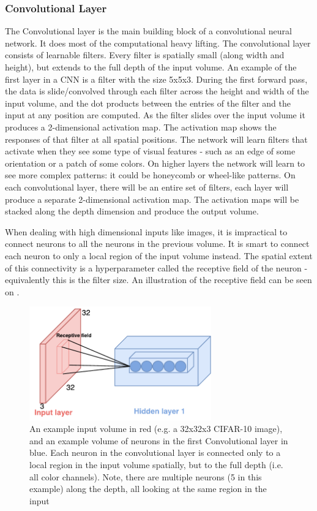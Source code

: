 \subsubsection{Convolutional Layer}
The Convolutional layer is the main building block of a convolutional neural network. It does most of the computational heavy lifting. The convolutional layer consists of learnable filters. Every filter is spatially small (along width and height), but extends to the full depth of the input volume. An example of the first layer in a CNN is a filter with the size 5x5x3. During the first forward pass, the data is slide/convolved through each filter across the height and width of the input volume, and the dot products between the entries of the filter and the input at any position are computed. As the filter slides over the input volume it produces a 2-dimensional activation map. The activation map shows the responses of that filter at all spatial positions. The network will learn filters that activate when they see some type of visual features - such as an edge of some orientation or a patch of some colors. On higher layers the network will learn to see more complex patterns: it could be honeycomb or wheel-like patterns. On each convolutional layer, there will be an entire set of filters, each layer will produce a separate 2-dimensional activation map. The activation maps will be stacked along the depth dimension and produce the output volume. 

When dealing with high dimensional inputs like images, it is impractical to connect neurons to all the neurons in the previous volume. It is smart to connect each neuron to only a local region of the input volume instead. The spatial extent of this connectivity is a hyperparameter called the receptive field of the neuron - equivalently this is the filter size. An illustration of the receptive field can be seen on .

\begin{figure}[H]
	\centering
	\includegraphics[width=0.7\textwidth]{Figures/Respective_field.pdf}
	\caption{An example input volume in red (e.g. a 32x32x3 CIFAR-10 image), and an example volume of neurons in the first Convolutional layer in blue. Each neuron in the convolutional layer is connected only to a local region in the input volume spatially, but to the full depth (i.e. all color channels). Note, there are multiple neurons (5 in this example) along the depth, all looking at the same region in the input \cite{CNN_course}}
	\label{fig:Respective_field}
\end{figure}

